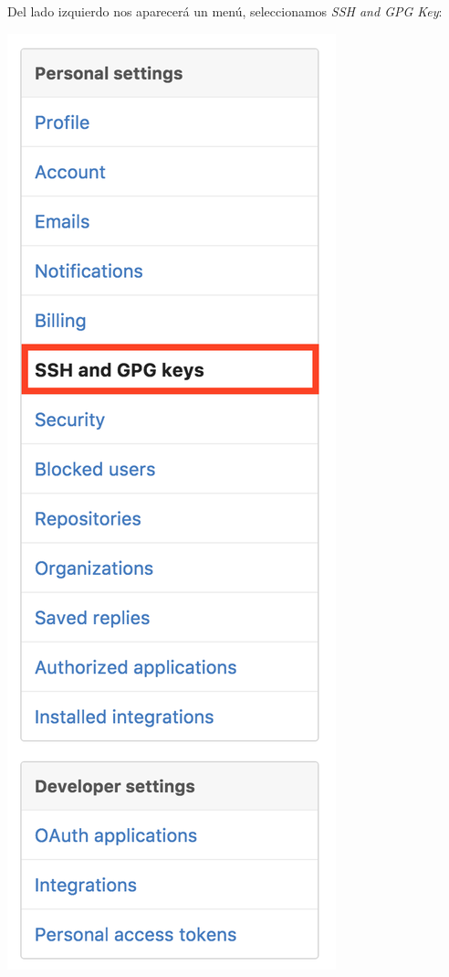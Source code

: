 \documentclass{article}
\begin{document}
\begin{itemize}
\begin{enumerate}
      Del lado izquierdo nos aparecerá un menú, seleccionamos \textit{SSH and GPG Key}:
      \begin{center}
        \includegraphics[scale=0.3]{3}
      \end{center}


\end{enumerate}
\end{itemize}
\end{document}
